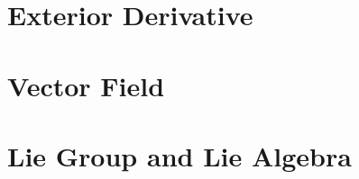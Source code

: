\documentclass{article}
\begin{document}
\section{Exterior Derivative}

\section{Vector Field}

\section{Lie Group and Lie Algebra}
\end{document}
